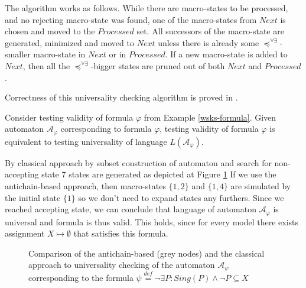 The algorithm works as follows. While there are macro-states to be processed,
and no rejecting macro-state was found, one of the macro-states from $Next$ is
chosen and moved to the $Processed$ set. All successors of the macro-state are
generated, minimized and moved to $Next$ unless there is already some
$\preceq^{\forall\exists}$-smaller macro-state in $Next$ or in $Processed$. If a
new macro-state is added to $Next$, then all the
$\preceq^{\forall\exists}$-bigger states are pruned out of both $Next$ and
$Processed$.
	
Correctness of this universality checking algorithm is proved in \cite{tacas}.

\noindent\hrulefill
\begin{example}
Consider testing validity of formula $\varphi$ from Example \ref{wsks-formula}.
Given automaton $\mathcal{A}_\varphi$ corresponding to formula $\varphi$,
testing validity of formula $\varphi$ is equivalent to testing universality of
language $L(\mathcal{A}_\varphi)$.

By classical approach by subset construction of automaton and search for
non-accepting state 7 states are generated as depicted at Figure
\ref{compare} If we use the antichain-based approach, then macro-states $\{1,
2\}$ and $\{1, 4\}$ are simulated by the initial state $\{1\}$ so we don't need
to expand states any furthers. Since we reached accepting state, we can conclude
that language of automaton $\mathcal{A}_\varphi$ is universal and formula is
thus valid. This holds, since for every model there exists assignment $X
\mapsto \emptyset$ that satisfies this formula.
\end{example}

\noindent\hrulefill

\begin{figure}
 \begin{center}
 \end{center}
 \caption{Comparison of the antichain-based (grey nodes) and the classical
 approach to universality checking of the automaton $\mathcal{A}_\psi$
 corresponding to the formula $\psi \overset{\mathit{def}}{=} \neg\exists P:
 Sing(P) \wedge\neg P \subseteq X$}\label{compare}
\end{figure}

